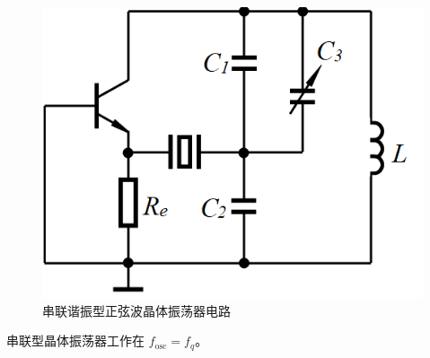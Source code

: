 \begin{figure}[htbp]
    \centering
    \includegraphics[scale=0.5]{image/Picture10.png}
    \caption{串联谐振型正弦波晶体振荡器电路}
\end{figure}

串联型晶体振荡器工作在 $f_{\text{osc}} = f_q$。


